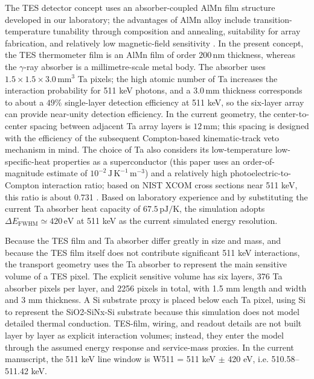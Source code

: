 \documentclass[11pt]{article}
\begin{document}
The TES detector concept uses an absorber-coupled AlMn film structure developed in our laboratory; the advantages of AlMn alloy include transition-temperature tunability through composition and annealing, suitability for array fabrication, and relatively low magnetic-field sensitivity \cite{Xie2026AlMn,Vavagiakis2017AlMnMagnetic}. In the present concept, the TES thermometer film is an AlMn film of order $200\,\mathrm{nm}$ thickness, whereas the $\gamma$-ray absorber is a millimetre-scale metal body. The absorber uses $1.5\times1.5\times3.0\,\mathrm{mm^3}$ Ta pixels; the high atomic number of Ta increases the interaction probability for 511 keV photons, and a $3.0\,\mathrm{mm}$ thickness corresponds to about a $49\%$ single-layer detection efficiency at 511 keV, so the six-layer array can provide near-unity detection efficiency. In the current geometry, the center-to-center spacing between adjacent Ta array layers is $12\,\mathrm{mm}$; this spacing is designed with the efficiency of the subsequent Compton-based kinematic-track veto mechanism in mind. The choice of Ta also considers its low-temperature low-specific-heat properties as a superconductor (this paper uses an order-of-magnitude estimate of $10^{-2}\,\mathrm{J\,K^{-1}\,m^{-3}}$) and a relatively high photoelectric-to-Compton interaction ratio; based on NIST XCOM cross sections near 511 keV, this ratio is about 0.731 \cite{NISTXCOM}. Based on laboratory experience and by substituting the current Ta absorber heat capacity of $67.5\,\mathrm{pJ/K}$, the simulation adopts $\Delta E_{\mathrm{FWHM}}\simeq420\,\mathrm{eV}$ at 511 keV as the current simulated energy resolution.

Because the TES film and Ta absorber differ greatly in size and mass, and because the TES film itself does not contribute significant 511 keV interactions, the transport geometry uses the Ta absorber to represent the main sensitive volume of a TES pixel. The explicit sensitive volume has six layers, 376 Ta absorber pixels per layer, and 2256 pixels in total, with 1.5 mm length and width and 3 mm thickness. A Si substrate proxy is placed below each Ta pixel, using Si to represent the SiO2-SiNx-Si substrate because this simulation does not model detailed thermal conduction. TES-film, wiring, and readout details are not built layer by layer as explicit interaction volumes; instead, they enter the model through the assumed energy response and service-mass proxies. In the current manuscript, the 511 keV line window is W511 = 511 keV $\pm$ 420 eV, i.e. 510.58--511.42 keV.
\end{document}
